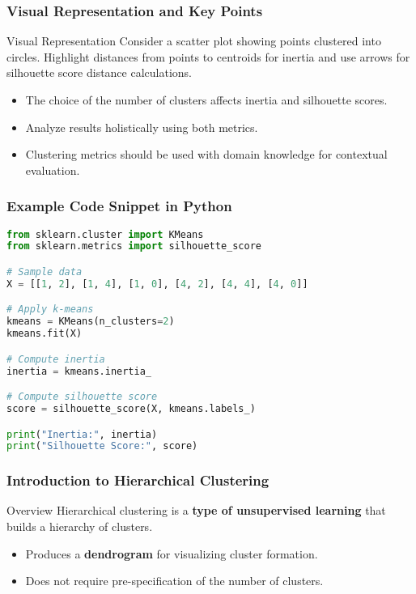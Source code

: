\documentclass[aspectratio=169]{beamer}
\begin{document}
\begin{frame}[fragile]
    \frametitle{Visual Representation and Key Points}
    \begin{block}{Visual Representation}
        Consider a scatter plot showing points clustered into circles. Highlight distances from points to centroids for inertia and use arrows for silhouette score distance calculations.
    \end{block}
    
    \begin{itemize}
        \item The choice of the number of clusters affects inertia and silhouette scores.
        \item Analyze results holistically using both metrics.
        \item Clustering metrics should be used with domain knowledge for contextual evaluation.
    \end{itemize}
\end{frame}

\begin{frame}[fragile]
    \frametitle{Example Code Snippet in Python}
    \begin{lstlisting}[language=Python]
from sklearn.cluster import KMeans
from sklearn.metrics import silhouette_score

# Sample data
X = [[1, 2], [1, 4], [1, 0], [4, 2], [4, 4], [4, 0]]

# Apply k-means
kmeans = KMeans(n_clusters=2)
kmeans.fit(X)

# Compute inertia
inertia = kmeans.inertia_

# Compute silhouette score
score = silhouette_score(X, kmeans.labels_)

print("Inertia:", inertia)
print("Silhouette Score:", score)
    \end{lstlisting}
\end{frame}

\begin{frame}[fragile]
    \frametitle{Introduction to Hierarchical Clustering}
    \begin{block}{Overview}
        Hierarchical clustering is a \textbf{type of unsupervised learning} that builds a hierarchy of clusters. 
        \begin{itemize}
            \item Produces a \textbf{dendrogram} for visualizing cluster formation.
            \item Does not require pre-specification of the number of clusters.
        \end{itemize}
    \end{block}
\end{frame}
\end{document}
